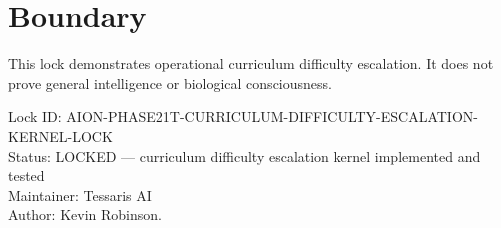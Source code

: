 \documentclass[11pt,a4paper]{article}
\begin{document}
\section{Boundary}

This lock demonstrates operational curriculum difficulty escalation. It does not prove general intelligence or biological consciousness.

\bigskip

\noindent
Lock ID: AION-PHASE21T-CURRICULUM-DIFFICULTY-ESCALATION-KERNEL-LOCK\\
Status: LOCKED --- curriculum difficulty escalation kernel implemented and tested\\
Maintainer: Tessaris AI\\
Author: Kevin Robinson.
\end{document}

